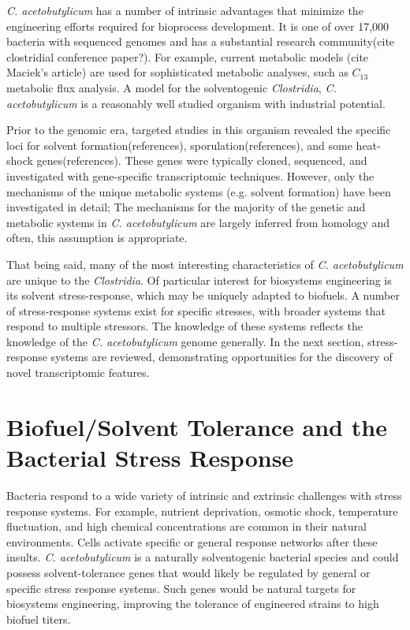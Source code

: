 \textit{C. acetobutylicum} has a number of intrinsic advantages that minimize the engineering efforts required for bioprocess development. It is one of over 17,000 bacteria with sequenced genomes\cite{89,90,91} and has a substantial research community(cite clostridial conference paper?). For example, current metabolic models (cite Maciek's article) are used for sophisticated metabolic analyses, such as $C_{13}$ metabolic flux analysis. A model for the solventogenic \textit{Clostridia}, \textit{C. acetobutylicum} is a reasonably well studied organism with industrial potential.

Prior to the genomic era, targeted studies in this organism revealed the specific loci for solvent formation(references), sporulation(references), and some heat-shock genes(references). These genes were typically cloned, sequenced, and  investigated with gene-specific transcriptomic techniques. However, only the mechanisms of the unique metabolic systems (e.g. solvent formation) have been investigated in detail; The mechanisms for the majority of the genetic and metabolic systems in \textit{C. acetobutylicum} are largely inferred from homology and often, this assumption is appropriate. 

That being said, many of the most interesting characteristics of \textit{C. acetobutylicum} are unique to the \textit{Clostridia}. Of particular interest for biosystems engineering is its solvent stress-response, which may be uniquely adapted to biofuels. A number of stress-response systems exist for specific stresses, with broader systems that respond to multiple stressors. The knowledge of these systems reflects the knowledge of the \textit{C. acetobutylicum} genome generally. In the next section, stress-response systems are reviewed, demonstrating opportunities for the discovery of novel transcriptomic features.

\section{Biofuel/Solvent Tolerance and the Bacterial Stress Response}


Bacteria respond to a wide variety of intrinsic and extrinsic challenges with stress response systems. For example, nutrient deprivation, osmotic shock, temperature fluctuation, and high chemical concentrations are common in their natural environments. Cells activate specific or general response networks after these insults. \textit{C. acetobutylicum} is a naturally solventogenic bacterial species and could possess solvent-tolerance genes that would likely be regulated by general or specific stress response systems. Such genes would be natural targets for biosystems engineering, improving the tolerance of engineered strains to high biofuel titers. 

